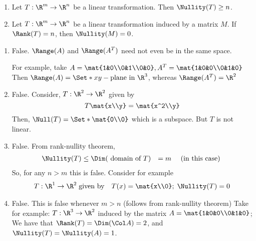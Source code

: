 \begin{exercises}
\begin{problist}
\begin{enumerate}
			\item Let $T:\R^{m}\to\R^{n}$ be a linear transformation. Then $\Nullity(T)
				\geq n$.

			\item Let $T:\R^{m}\to\R^{n}$ be a linear transformation induced by
				a matrix $M$. If $\Rank(T) = n$, then $\Nullity(M) = 0$.
		\end{enumerate}


		\begin{solution}

			\begin{enumerate}
				\item False. $\Range(A)$ and $\Range(A^{T})$ need not even
					be in the same space.

					For example, take $A=\mat{1&0\\0&1\\0&0}, A^{T}=\mat{1&0&0\\0&1&0}$
					Then $\Range(A)=\Set*{xy-\text{plane in }\R^3}$,
					whereas $\Range(A^{T})=\R^{2}$

				\item False. Consider, $T:\R^{2}\to\R^{2}$ given by
					\[
						T\mat{x\\y}=\mat{x^2\\y}
					\]
					 Then, $\Null(T)= \Set*{\mat{0\\0}}$ which is a subspace.
					But $T$ is not linear.

				\item False. From rank-nullity theorem,
					\begin{align*}
						\Nullity(T) & \leq \Dim(\text{ domain of }T) & =m \quad \text{ (in this case) }
					\end{align*}So, for any $n>m$ this is false. Consider
					for example
					\begin{align*}
						 & T:\R^{1}\to\R^{2}\;\text{given by} & T(x)=\mat{x\\0};\; \Nullity(T)=0
					\end{align*}

				\item False. This is false whenever $m>n$ (follows from rank-nullity
					theorem) Take for example: $T:\R^{3}\to\R^{2}$ induced
					by the matrix $A=\mat{1&0&0\\0&1&0}$;\\ We have that $\Rank(T)=\Dim(\Col
					A)=2$, and $\Nullity(T) = \Nullity(A)=1$.
			\end{enumerate}
		\end{solution}


\end{problist}
\end{exercises}
